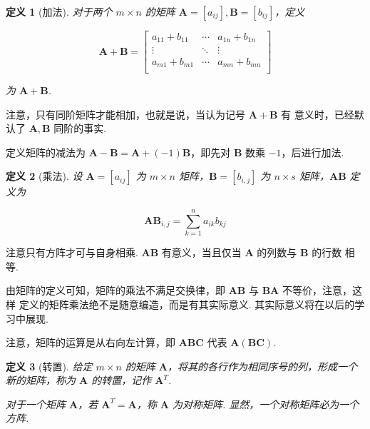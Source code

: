 \documentclass[a4paper]{article}
\newtheorem{definition}{定义}[section]
\begin{document}
\begin{definition}[加法]
    对于两个 $m\times n$ 的矩阵 $\boldsymbol A=[a_{ij}],\boldsymbol B=[b_{ij}]$，定义

    \begin{equation*}
        \boldsymbol A+\boldsymbol B=\begin{bmatrix}
            a_{11}+b_{11} & \cdots & a_{1n}+b_{1n} \\
            \vdots        & \ddots & \vdots        \\
            a_{m1}+b_{m1} & \cdots & a_{mn}+b_{mn} \\
        \end{bmatrix}
    \end{equation*}

    为 $\boldsymbol A+\boldsymbol B$.
\end{definition}

注意，只有同阶矩阵才能相加，也就是说，当认为记号 $\boldsymbol A+\boldsymbol B$ 有
意义时，已经默认了 $\boldsymbol A,\boldsymbol B$ 同阶的事实.

定义矩阵的减法为 $\boldsymbol A-\boldsymbol B=\boldsymbol A+(-1)\boldsymbol B
$，即先对 $\boldsymbol B$ 数乘 $-1$，后进行加法.

\begin{definition}[乘法]
    设 $\boldsymbol A=[a_{ij}]$ 为 $m\times n$ 矩阵，$\boldsymbol B=[b_{i,j}]$ 为 $n\times s$ 矩阵，$\boldsymbol A\boldsymbol
        B$ 定义为

    \begin{equation*}
        \boldsymbol A\boldsymbol B_{i,j}=\sum\limits_{k=1}^n a_{ik}b_{kj}
    \end{equation*}
\end{definition}

注意只有方阵才可与自身相乘. $\boldsymbol A\boldsymbol B$ 有意义，当且仅当 $\boldsymbol A$ 的列数与 $\boldsymbol B$ 的行数
相等.

由矩阵的定义可知，矩阵的乘法不满足交换律，即 $\boldsymbol A\boldsymbol B$ 与 $\boldsymbol B\boldsymbol A$ 不等价，注意，这样
定义的矩阵乘法绝不是随意编造，而是有其实际意义. 其实际意义将在以后的学习中展现.

注意，矩阵的运算是从右向左计算，即 $\boldsymbol A\boldsymbol B\boldsymbol C$ 代表 $\boldsymbol A(\boldsymbol B \boldsymbol C)$.

\begin{definition}[转置]
    给定 $m\times n$ 的矩阵 $\boldsymbol A$，将其的各行作为相同序号的列，形成一个新的矩阵，称为 $\boldsymbol A$ 的转置，记作 $\boldsymbol A^T$.

    对于一个矩阵 $\boldsymbol A$，若 $\boldsymbol A^T=\boldsymbol A$，称 $\boldsymbol A$ 为对称矩阵. 显然，一个对称矩阵必为一个方阵.
\end{definition}
\end{document}
